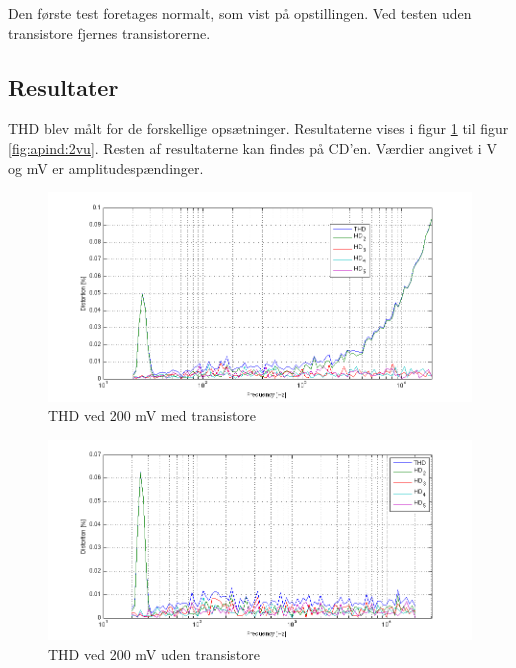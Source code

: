 Den første test foretages normalt, som vist på opstillingen. Ved testen uden transistore fjernes transistorerne.	

\subsection*{Resultater}

THD blev målt for de forskellige opsætninger. Resultaterne vises i figur \ref{fig:apind:200mvm} til figur \ref{fig:apind:2vu}. Resten af resultaterne kan findes på CD'en. Værdier angivet i V og mV er amplitudespændinger.

\begin{figure}[h]
\centering
\includegraphics[width=\textwidth]{maalerapporter/indgangsvaelger/maalinger/opa/mic 200mv opa muxudgang thd.png}
\caption{THD ved 200 mV med transistore}
\label{fig:apind:200mvm}
\end{figure}


\begin{figure}[h]
\centering
\includegraphics[width=\textwidth]{maalerapporter/indgangsvaelger/maalinger/opa/mic 200mv opa muxudgang uden transistor thd.png}
\caption{THD ved 200 mV uden transistore}
\label{fig:apind:200mvu}
\end{figure}

